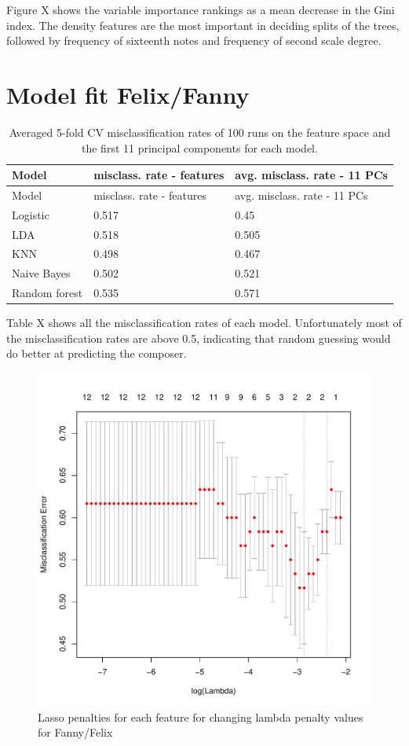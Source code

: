 \documentclass[12pt,twoside]{reedthesis}
\theoremstyle{definition}
\theoremstyle{definition}
\theoremstyle{definition}
\theoremstyle{remark}
\begin{document}
Figure X shows the variable importance rankings as a mean decrease in
the Gini index. The density features are the most important in deciding
splits of the trees, followed by frequency of sixteenth notes and
frequency of second scale degree.

\section{Model fit Felix/Fanny}\label{model-fit-felixfanny}
\begin{longtable}[]{@{}lll@{}}
\caption{Averaged 5-fold CV misclassification rates of 100 runs on the
feature space and the first 11 principal components for each
model.}\tabularnewline
\toprule
Model & misclass. rate - features & avg. misclass. rate - 11
PCs\tabularnewline
\midrule
\endfirsthead
\toprule
Model & misclass. rate - features & avg. misclass. rate - 11
PCs\tabularnewline
\midrule
\endhead
Logistic & 0.517 & 0.45\tabularnewline
LDA & 0.518 & 0.505\tabularnewline
KNN & 0.498 & 0.467\tabularnewline
Naive Bayes & 0.502 & 0.521\tabularnewline
Random forest & 0.535 & 0.571\tabularnewline
\bottomrule
\end{longtable}
Table X shows all the misclassification rates of each model.
Unfortunately most of the misclassification rates are above 0.5,
indicating that random guessing would do better at predicting the
composer.
\begin{figure}[h]
\centering
\includegraphics[scale = .5]{images/lasso_coef_f.pdf}
\caption{Lasso penalties for each feature for changing lambda penalty values for Fanny/Felix}
\label{subd}
\end{figure}
\end{document}

